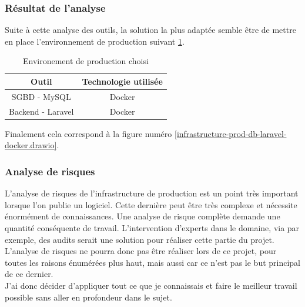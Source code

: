 \documentclass[
    iai, %
    il, %
]{heig-tb}
\begin{document}

\subsubsection{Résultat de l'analyse}
Suite à cette analyse des outils, la solution la plus adaptée semble être de mettre en place
l'environnement de production suivant \ref{env-prod}.

\begin{table}[h]
    \begin{center}
        \caption{Environement de production choisi \label{env-prod}}
        \begin{tabular}{c|c}
            Outil             & Technologie utilisée \\ \hline
            SGBD - MySQL      & Docker               \\
            Backend - Laravel & Docker               \\
        \end{tabular}
    \end{center}
\end{table}

Finalement cela correspond à la figure numéro \ref{infrastructure-prod-db-laravel-docker.drawio}.

\subsubsection{Analyse de risques}

L'analyse de risques de l'infrastructure de production est un point très important lorsque l'on publie un logiciel. Cette dernière peut être très complexe et nécessite énormément de connaissances.
Une analyse de risque complète demande une quantité conséquente de travail. L'intervention d'experts dans le domaine, via par exemple, des audits serait une solution pour réaliser cette partie du projet.\\
L'analyse de risques ne pourra donc pas être réaliser lors de ce projet, pour toutes les raisons énumérées plus haut, mais aussi car ce n'est pas le but principal de ce dernier.\\
J'ai donc décider d'appliquer tout ce que je connaissais et faire le meilleur travail possible sans aller en profondeur dans le sujet.
\end{document}
